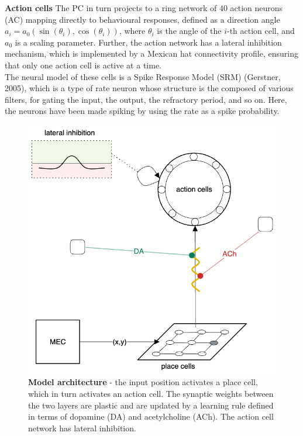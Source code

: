 \noindent\textbf{Action cells}
\hfill \break
\noindent The PC in turn projects to a ring network of $40$ action neurons (AC) mapping directly to behavioural responses, defined as a direction angle \\ $a_{i}=a_{0}(\sin(\theta_{i}), \cos(\theta_{i}))$, where $\theta_{i}$ is the angle of the $i$-th action cell, and $a_{0}$ is a scaling parameter.
Further, the action network has a lateral inhibition mechanism, which is implemented by a Mexican hat connectivity profile, ensuring that only one action cell is active at a time.
\\ The neural
model of these cells is a Spike Response Model (SRM) (Gerstner, 2005), which is a type of rate neuron whose structure is the composed of various filters, for gating the input, the output, the refractory period, and so on. Here, the neurons have been made spiking by using the rate as a spike
probability.
\vspace{0.25cm}

\begin{figure}[ht]
    \centering
    \includegraphics[scale=0.3]{figures/model_brzosko_architecture.png} 
    \caption{\textbf{Model architecture} - the input position activates a place cell, which in turn activates an action cell. The synaptic weights between the two layers are plastic and are updated by a learning rule defined in terms of dopamine (DA) and acetylcholine (ACh). The action cell network
    has lateral inhibition.}
    \label{fig:model_2}
\end{figure}

